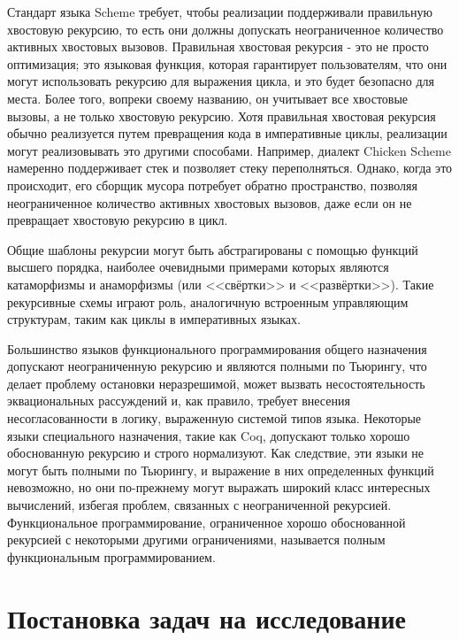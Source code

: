Стандарт языка Scheme требует, чтобы реализации поддерживали правильную хвостовую рекурсию, то есть они должны допускать неограниченное количество активных хвостовых вызовов. Правильная хвостовая рекурсия - это не просто оптимизация; это языковая функция, которая гарантирует пользователям, что они могут использовать рекурсию для выражения цикла, и это будет безопасно для места. Более того, вопреки своему названию, он учитывает все хвостовые вызовы, а не только хвостовую рекурсию. Хотя правильная хвостовая рекурсия обычно реализуется путем превращения кода в императивные циклы, реализации могут реализовывать это другими способами. Например, диалект Chicken Scheme намеренно поддерживает стек и позволяет стеку переполняться. Однако, когда это происходит, его сборщик мусора потребует обратно пространство, позволяя неограниченное количество активных хвостовых вызовов, даже если он не превращает хвостовую рекурсию в цикл.

Общие шаблоны рекурсии могут быть абстрагированы с помощью функций высшего порядка, наиболее очевидными примерами которых являются катаморфизмы и анаморфизмы (или <<свёртки>> и <<развёртки>>). Такие рекурсивные схемы играют роль, аналогичную встроенным управляющим структурам, таким как циклы в императивных языках.

Большинство языков функционального программирования общего назначения допускают неограниченную рекурсию и являются полными по Тьюрингу, что делает проблему остановки неразрешимой, может вызвать несостоятельность эквациональных рассуждений и, как правило, требует внесения несогласованности в логику, выраженную системой типов языка. Некоторые языки специального назначения, такие как Coq, допускают только хорошо обоснованную рекурсию и строго нормализуют. Как следствие, эти языки не могут быть полными по Тьюрингу, и выражение в них определенных функций невозможно, но они по-прежнему могут выражать широкий класс интересных вычислений, избегая проблем, связанных с неограниченной рекурсией. Функциональное программирование, ограниченное хорошо обоснованной рекурсией с некоторыми другими ограничениями, называется полным функциональным программированием. 


\section{Постановка задач на исследование}\label{sec:ch1/sec9}

